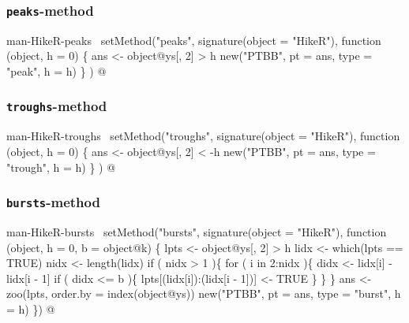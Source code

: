 \documentclass[a4paper]{article}
\begin{document}
\subsubsection{\texttt{peaks}-method}

\nwenddocs{}\endmoddef
\LA{}man-HikeR-peaks~{\nwtagstyle{}}\RA{}
setMethod("peaks",
    signature(object = "HikeR"),
    function (object, h = 0) \{
        ans <- object@ys[, 2] > h
        new("PTBB", pt = ans, type = "peak", h = h)
    \}
)
\nwendcode{}@

\subsubsection{\texttt{troughs}-method}

\nwenddocs{}\endmoddef
\LA{}man-HikeR-troughs~{\nwtagstyle{}}\RA{}
setMethod("troughs",
    signature(object = "HikeR"),
    function (object, h = 0) \{
        ans <- object@ys[, 2] < -h
        new("PTBB", pt = ans, type = "trough", h = h)
    \}
)
\nwendcode{}@

\subsubsection{\texttt{bursts}-method}

\nwenddocs{}\endmoddef
\LA{}man-HikeR-bursts~{\nwtagstyle{}}\RA{}
setMethod("bursts",
    signature(object = "HikeR"),
    function (object, h = 0, b = object@k) \{
        lpts <- object@ys[, 2] > h
        lidx <- which(lpts == TRUE)
        nidx <- length(lidx)
        if ( nidx > 1 )\{
            for ( i in 2:nidx )\{
                didx <- lidx[i] - lidx[i - 1]
                if ( didx <= b )\{
                    lpts[(lidx[i]):(lidx[i - 1])] <- TRUE
                \}
            \}
        \}
        ans <- zoo(lpts, order.by = index(object@ys))
        new("PTBB", pt = ans, type = "burst", h = h)
\})
\nwendcode{}@
\end{document}
